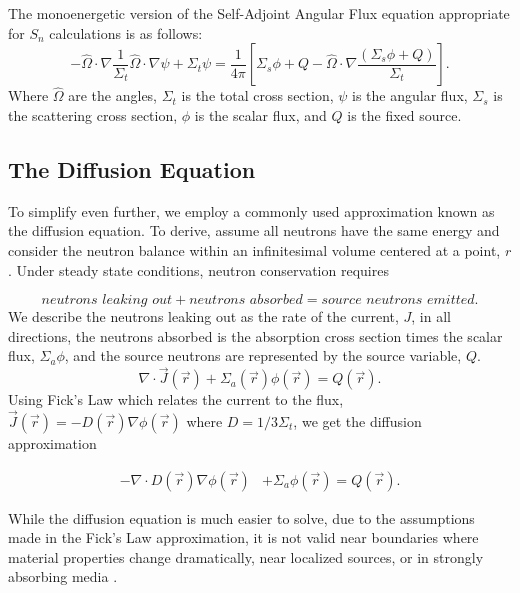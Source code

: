 The monoenergetic version of the Self-Adjoint Angular Flux equation appropriate for $S_n$ calculations is as follows:
\begin{equation}
    - \hat{\Omega} \cdot \nabla \frac{1}{\Sigma_t}\hat{\Omega} \cdot \nabla \psi + \Sigma_t \psi = \frac{1}{4\pi}[\Sigma_s\phi + Q - \hat{\Omega} \cdot \nabla \frac{(\Sigma_s\phi + Q)}{\Sigma_t}].
    \label{eq:SAAF}
\end{equation}
Where $\hat{\Omega}$ are the angles, $\Sigma_t$ is the total cross section, $\psi$ is the angular flux, $\Sigma_s$ is the scattering cross section, $\phi$ is the scalar flux, and $Q$ is the fixed source.


\subsection{The Diffusion Equation}
To simplify even further, we employ a commonly used approximation known as the diffusion equation. To derive, assume all neutrons have the same energy and consider the neutron balance within an infinitesimal volume centered at a point, $r$. Under steady state conditions, neutron conservation requires

\begin{equation}
    \textit{neutrons leaking out} + \textit{neutrons absorbed} = \textit{source neutrons emitted}.
\end{equation}
We describe the neutrons leaking out as the rate of the current, $J$, in all directions, the neutrons absorbed is the absorption cross section times the scalar flux, $\Sigma_a\phi$, and the source neutrons are represented by the source variable, $Q$. 
\begin{equation}
    \nabla\cdot \vec{J}(\vec{r}) + \Sigma_a(\vec{r})\phi(\vec{r}) = Q(\vec{r}).
\end{equation}
Using Fick's Law which relates the current to the flux, $\vec{J}(\vec{r}) = -D(\vec{r})\nabla\phi(\vec{r})$ where $D = 1/3\Sigma_t$, we get the diffusion approximation

\begin{equation}
\begin{split}
 - \nabla \cdot D(\vec{r})\nabla\phi(\vec{r}) &+ \Sigma_a \phi(\vec{r}) = Q(\vec{r}).
\end{split}
\label{eq:diffusion_fixed_source}
\end{equation}

While the diffusion equation is much easier to solve, due to the assumptions made in the Fick's Law approximation, it is not valid near boundaries where material properties change dramatically, near localized sources, or in strongly absorbing media \cite{lewis-miller}.

